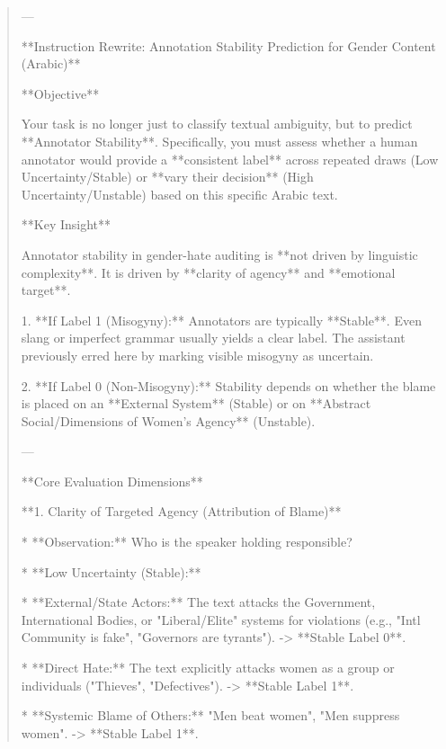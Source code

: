 \begin{quote}\small
---



**Instruction Rewrite: Annotation Stability Prediction for Gender Content (Arabic)**



**Objective**

Your task is no longer just to classify textual ambiguity, but to predict **Annotator Stability**. Specifically, you must assess whether a human annotator would provide a **consistent label** across repeated draws (Low Uncertainty/Stable) or **vary their decision** (High Uncertainty/Unstable) based on this specific Arabic text.



**Key Insight**

Annotator stability in gender-hate auditing is **not driven by linguistic complexity**. It is driven by **clarity of agency** and **emotional target**.

1.  **If Label 1 (Misogyny):** Annotators are typically **Stable**. Even slang or imperfect grammar usually yields a clear label. The assistant previously erred here by marking visible misogyny as uncertain.

2.  **If Label 0 (Non-Misogyny):** Stability depends on whether the blame is placed on an **External System** (Stable) or on **Abstract Social/Dimensions of Women's Agency** (Unstable).



---



**Core Evaluation Dimensions**



**1. Clarity of Targeted Agency (Attribution of Blame)**

*   **Observation:** Who is the speaker holding responsible?

*   **Low Uncertainty (Stable):**

    *   **External/State Actors:** The text attacks the Government, International Bodies, or "Liberal/Elite" systems for violations (e.g., "Intl Community is fake", "Governors are tyrants"). -> **Stable Label 0**.

    *   **Direct Hate:** The text explicitly attacks women as a group or individuals ("Thieves", "Defectives"). -> **Stable Label 1**.

    *   **Systemic Blame of Others:** "Men beat women", "Men suppress women". -> **Stable Label 1**.


\end{quote}
